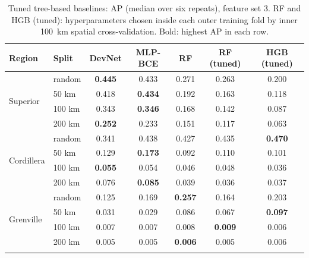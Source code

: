 \documentclass[pdflatex,sn-apa]{sn-jnl}
\begin{document}
\begin{table}[t]
\caption{Tuned tree-based baselines: AP (median over six repeats), feature set 3. RF and HGB (tuned): hyperparameters chosen inside each outer training fold by inner 100~km spatial cross-validation. Bold: highest AP in each row.}\label{tab:controls}
\footnotesize
\setlength{\tabcolsep}{3pt}
\begin{tabular*}{\textwidth}{@{\extracolsep\fill}llccccc}
\toprule
Region & Split & DevNet & MLP-BCE & RF & RF (tuned) & HGB (tuned) \\
\midrule
\multirow{4}{*}{Superior} & random & \textbf{0.445} & 0.433 & 0.271 & 0.263 & 0.200 \\
 & 50 km & 0.418 & \textbf{0.434} & 0.192 & 0.163 & 0.118 \\
 & 100 km & 0.343 & \textbf{0.346} & 0.168 & 0.142 & 0.087 \\
 & 200 km & \textbf{0.252} & 0.233 & 0.151 & 0.117 & 0.063 \\
\midrule
\multirow{4}{*}{Cordillera} & random & 0.341 & 0.438 & 0.427 & 0.435 & \textbf{0.470} \\
 & 50 km & 0.129 & \textbf{0.173} & 0.092 & 0.110 & 0.101 \\
 & 100 km & \textbf{0.055} & 0.054 & 0.046 & 0.048 & 0.036 \\
 & 200 km & 0.076 & \textbf{0.085} & 0.039 & 0.036 & 0.037 \\
\midrule
\multirow{4}{*}{Grenville} & random & 0.125 & 0.169 & \textbf{0.257} & 0.164 & 0.203 \\
 & 50 km & 0.031 & 0.029 & 0.086 & 0.067 & \textbf{0.097} \\
 & 100 km & 0.007 & 0.007 & 0.008 & \textbf{0.009} & 0.006 \\
 & 200 km & 0.005 & 0.005 & \textbf{0.006} & 0.005 & 0.006 \\
\botrule
\end{tabular*}
\end{table}
\end{document}
